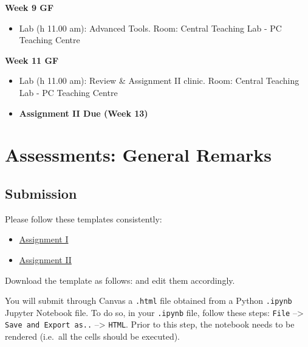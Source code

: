 \documentclass[
  letterpaper,
  DIV=11,
  numbers=noendperiod]{scrreprt}
\providecommand{\tightlist}{%
  \setlength{\itemsep}{0pt}\setlength{\parskip}{0pt}}\usepackage{longtable,booktabs,array}
\begin{document}
\textbf{Week 9 GF}

\begin{itemize}
\tightlist
\item
  Lab (h 11.00 am): Advanced Tools. Room: Central Teaching Lab - PC
  Teaching Centre
\end{itemize}

\textbf{Week 11 GF}

\begin{itemize}
\item
  Lab (h 11.00 am): Review \& Assignment II clinic. Room: Central
  Teaching Lab - PC Teaching Centre
\item
  \textbf{Assignment II Due (Week 13)}
\end{itemize}


\chapter*{Assessments: General
Remarks}\label{assessments-general-remarks}


\section*{Submission}\label{submission}


Please follow these templates consistently:

\begin{itemize}
\item
  \href{https://github.com/GDSL-UL/wma/blob/main/templates/Assignment1_template.ipynb}{Assignment
  I}
\item
  \href{https://github.com/GDSL-UL/wma/blob/main/templates/Assignment2_template.ipynb}{Assignment
  II}
\end{itemize}

Download the template as follows: and edit them accordingly.

You will submit through Canvas a \texttt{.html} file obtained from a
Python \texttt{.ipynb} Jupyter Notebook file. To do so, in your
\texttt{.ipynb} file, follow these steps: \texttt{File} --\textgreater{}
\texttt{Save\ and\ Export\ as..} --\textgreater{} \texttt{HTML}. Prior
to this step, the notebook needs to be rendered (i.e.~all the cells
should be executed).
\end{document}

